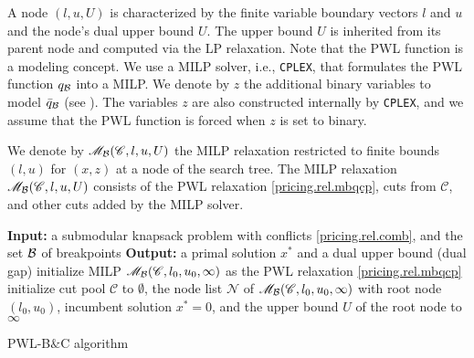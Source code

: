 A node $(l, u, U)$ is characterized by the finite variable boundary vectors $l$ and $u$ and the node's dual upper bound $U$. The upper bound $U$ is inherited from its parent node and computed via the LP relaxation. Note that the PWL function is a modeling concept. We use a MILP solver, i.e., \texttt{CPLEX}, that formulates the PWL function $q_{\mathcal B}$ into a MILP. We denote by $z$ the additional binary variables to model \(\bar{q}_{\mathcal B}\) (see ).  The variables $z$ are also constructed internally by \texttt{CPLEX}, and we assume that the PWL function is forced when $z$ is set to binary.

We denote by \(\mathscr{M}_\mathcal B(\mathscr{C}, l, u, U)\) the MILP relaxation restricted to finite bounds $(l,u)$ for $(x,z)$ at a node of the search tree. The MILP relaxation \(\mathscr{M}_\mathcal B(\mathscr{C}, l, u, U)\) consists of the PWL relaxation \eqref{pricing.rel.mbqcp}, cuts from $\mathscr{C}$, and other cuts added by the MILP solver.

\begin{algorithm}[htbp]
\SetAlgoLined
 \textbf{Input:} a submodular knapsack problem with conflicts \eqref{pricing.rel.comb}, and the set $\mathcal B$ of breakpoints\;
   \textbf{Output:} a primal solution $x^\ast$ and a dual upper bound (dual gap)\;
    initialize MILP \(\mathscr{M}_\mathcal B(\mathscr{C}, l_0, u_0, \infty)\) as the PWL relaxation \eqref{pricing.rel.mbqcp} 
  initialize  cut pool \(\mathscr{C}\) to \(\emptyset\), the node list \(\mathscr{N}\) of  \(\mathscr{M}_\mathcal B(\mathscr{C}, l_0, u_0, \infty)\) with root node \((l_0,u_0)\), incumbent solution \(x^\ast = 0\), and the  upper bound  \(U\)  of the root node to \(\infty\)\;
 \caption{PWL-B$\&$C algorithm}
 \label{algo}
\end{algorithm}

